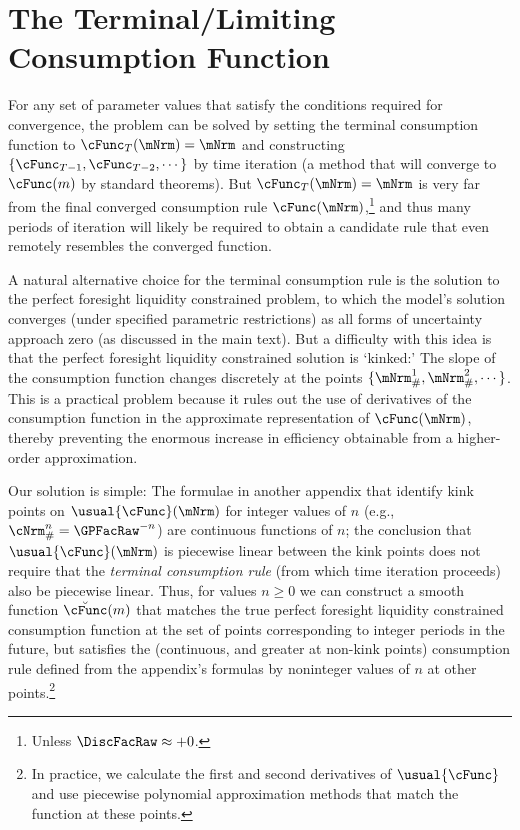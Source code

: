 \documentclass[\econtexRoot/BufferStockTheory]{subfiles}
\begin{document}
\section{The Terminal/Limiting Consumption Function}\label{sec:ApndxSolnMethTermFunc}

For any set of parameter values that satisfy the conditions required for convergence, the problem can be solved by setting the terminal consumption function to $\cFunc_{T}(\mNrm) = \mNrm$ and constructing $\{\cFunc_{T-1}, \cFunc_{T-2}, \cdots \}$ by time iteration (a method that will converge to $\cFunc(m)$ by standard theorems).  But $\cFunc_{T}(\mNrm)=\mNrm$ is very far from the final converged consumption rule $\cFunc(\mNrm)$,\footnote{Unless $\DiscFacRaw \approx +0$.} and thus many periods of iteration will likely be required to obtain a candidate rule that even remotely resembles the converged function.

A natural alternative choice for the terminal consumption rule is the solution to the perfect foresight liquidity constrained problem, to which the model's solution converges (under specified parametric restrictions) as all forms of uncertainty approach zero (as discussed in the main text).  But a difficulty with this idea is that the perfect foresight liquidity constrained solution is `kinked:' The slope of the consumption function changes discretely at the points $\{\mNrm^{1}_{\#},\mNrm^{2}_{\#},\cdots\}$.  This is a practical problem because it rules out the use of derivatives of the consumption function in the approximate representation of $\cFunc(\mNrm)$, thereby preventing the enormous increase in efficiency obtainable from a higher-order approximation.

Our solution is simple: The formulae in another appendix that identify kink points on $\usual{\cFunc}(\mNrm)$ for integer values of $n$ (e.g., $\cNrm_{\#}^{n} = \GPFacRaw^{-n}$) are continuous functions of $n$; the conclusion that $\usual{\cFunc}(\mNrm)$ is piecewise linear between the kink points does not require that the \textit{terminal consumption rule} (from which time iteration proceeds) also be piecewise linear.  Thus, for values $n \geq 0$ we can construct a smooth function $\breve{\cFunc}(m)$ that matches the true perfect foresight liquidity constrained consumption function at the set of points corresponding to integer periods in the future, but satisfies the (continuous, and greater at non-kink points) consumption rule defined from the appendix's formulas by noninteger values of $n$ at other points.\footnote{In practice, we calculate the first and second derivatives of $\usual{\cFunc}$ and use piecewise polynomial approximation methods that match the function at these points.}
\end{document}
